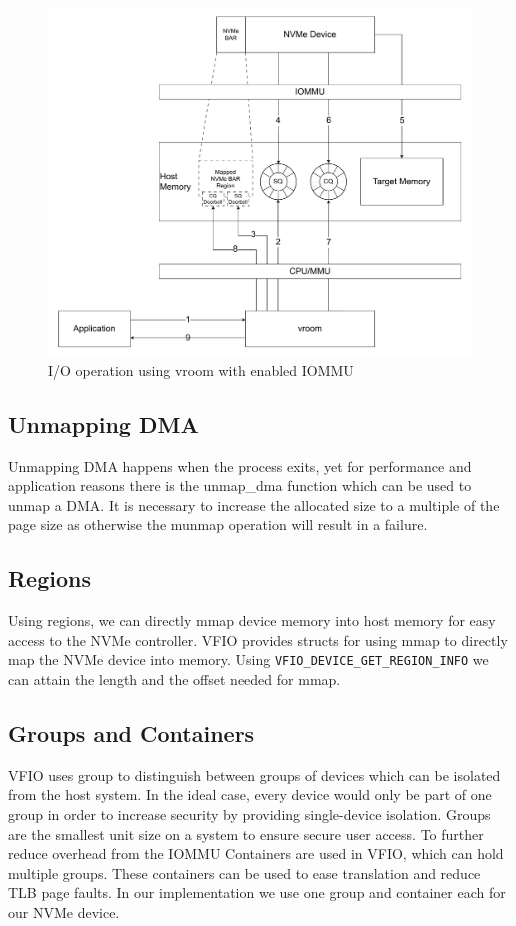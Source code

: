 \begin{figure}
    \centering
    \includegraphics[width=\textwidth]{figures/vroomdiagram.pdf}
    \caption{I/O operation using vroom with enabled IOMMU}
    \label{fig:vroom-graph}
\end{figure}

\subsection{Unmapping DMA}
Unmapping DMA happens when the process exits, yet for performance and application reasons there is the unmap\_dma function which can be used to unmap a DMA. It is necessary to increase the allocated size to a multiple of the page size as otherwise the munmap operation will result in a failure.

\subsection{Regions}
Using regions, we can directly mmap device memory into host memory for easy access to the NVMe controller.
VFIO provides structs for using mmap to directly map the NVMe device into memory. Using \texttt{VFIO\_DEVICE\_GET\_REGION\_INFO} we can attain the length and the offset needed for mmap.

\subsection{Groups and Containers}
VFIO uses group to distinguish between groups of devices which can be isolated from the host system. In the ideal case, every device would only be part of one group in order to increase security by providing single-device isolation. Groups are the smallest unit size on a system to ensure secure user access.
To further reduce overhead from the IOMMU Containers are used in VFIO, which can hold multiple groups. These containers can be used to ease translation and reduce TLB page faults.
In our implementation we use one group and container each for our NVMe device.

